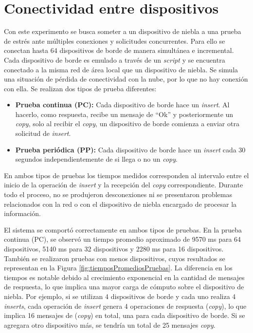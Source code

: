 \section{Conectividad entre dispositivos}
\label{sec:conectividadDispositivos}
Con este experimento se busca someter a un dispositivo de niebla a una prueba de estrés ante múltiples conexiones y solicitudes concurrentes. Para ello se conectan hasta 64 dispositivos de borde de manera simultánea e incremental. Cada dispositivo de borde es emulado a través de un \textit{script} y se encuentra conectado a la misma red de área local que un dispositivo de niebla. Se simula una situación de pérdida de conectividad con la nube, por lo que no hay conexión con ella. Se realizan dos tipos de prueba diferentes:
\begin{itemize}
    \item \textbf{Prueba continua (PC):} Cada dispositivo de borde hace un \textit{insert}. Al hacerlo, como respuesta, recibe un mensaje de ``Ok'' y posteriormente un \textit{copy}, solo al recibir el \textit{copy}, un dispositivo de borde comienza a enviar otra solicitud de \textit{insert}.
    \item \textbf{Prueba periódica (PP):} Cada dispositivo de borde hace un \textit{insert} cada 30 segundos independientemente de si llega o no un \textit{copy}.
\end{itemize}

En ambos tipos de pruebas los tiempos medidos corresponden al intervalo entre el inicio de la operación de \textit{insert} y la recepción del \textit{copy} correspondiente. Durante todo el proceso, no se produjeron desconexiones ni se presentaron problemas relacionados con la red o con el dispositivo de niebla encargado de procesar la información.
 
El sistema se comportó correctamente en ambos tipos de pruebas. En la prueba continua (PC), se observó un tiempo promedio aproximado de 9570 ms para 64 dispositivos, 5140 ms para 32 dispositivos y 2280 ms para 16 dispositivos. También se realizaron pruebas con menos dispositivos, cuyos resultados se representan en la Figura \ref{fig:tiemposPromediosPruebas}. La diferencia en los tiempos es notable debido al crecimiento exponencial en la cantidad de mensajes de respuesta, lo que implica una mayor carga de cómputo sobre el dispositivo de niebla. Por ejemplo, si se utilizan 4 dispositivos de borde y cada uno realiza 4 \textit{inserts}, cada operación de \textit{insert} genera 4 operaciones de respuesta (\textit{copy}), lo que implica 16 mensajes de (\textit{copy}) en total, una para cada dispositivo de borde. Si se agregara otro dispositivo más, se tendría un total de 25 mensajes \textit{copy}.

